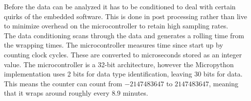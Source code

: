 Before the data can be analyzed it has to be conditioned to deal with certain quirks of the embedded software. This is done in post processing rather than live to minimize overhead on the microcontroller to retain high sampling rates.\\

The data conditioning scans through the data and generates a rolling time from the wrapping times. The microcontroller measures time since start up by counting clock cycles. These are converted to microseconds stored as an integer value. The microcontroller is a 32-bit architecture, however the Micropython implementation uses 2 bits for data type identification, leaving 30 bits for data. This means the counter can count from $-2147483647$ to $2147483647$, meaning that it wraps around roughly every $8.9$ minutes.\\